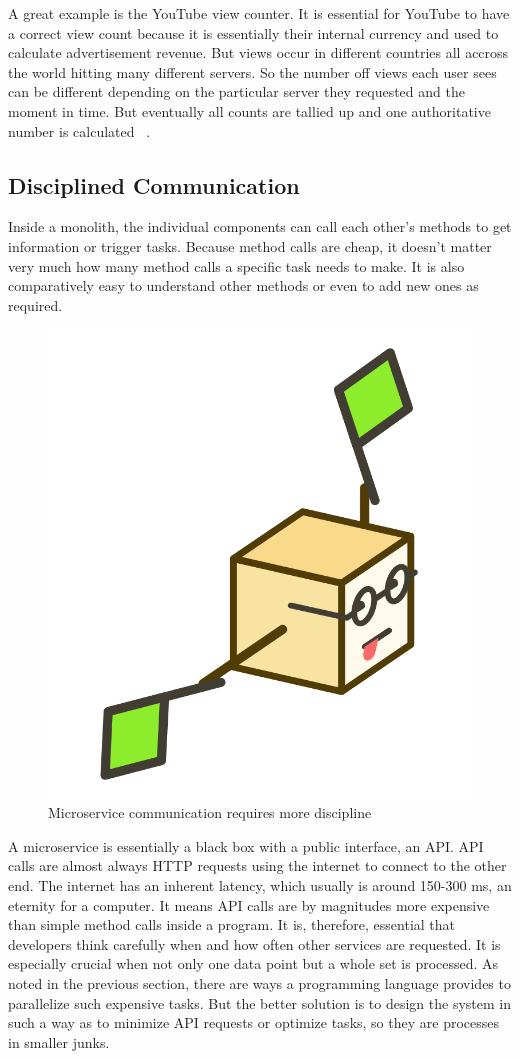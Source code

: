 A great example is the YouTube view counter. It is essential for YouTube to have a correct view count because it is essentially their internal currency and used to calculate advertisement revenue. But views occur in different countries all accross the world hitting many different servers. So the number off views each user sees can be different depending on the particular server they requested and the moment in time. But eventually all counts are tallied up and one authoritative number is calculated
~\cite{scott.2018}.


\subsection{Disciplined Communication}
\label{sec:theory:challenges:communication}

Inside a monolith, the individual components can call each other's methods to get information or trigger tasks. Because method calls are cheap, it doesn't matter very much how many method calls a specific task needs to make. It is also comparatively easy to understand other methods or even to add new ones as required.

\begin{figure}[ht]
  \centering
  \includegraphics[width=0.25\linewidth]{assets/illustration-microservice-flags.png}
  \caption{Microservice communication requires more discipline}
\end{figure}

A microservice is essentially a black box with a public interface, an API. API calls are almost always HTTP requests using the internet to connect to the other end. The internet has an inherent latency, which usually is around 150-300 ms, an eternity for a computer. It means API calls are by magnitudes more expensive than simple method calls inside a program. It is, therefore, essential that developers think carefully when and how often other services are requested. It is especially crucial when not only one data point but a whole set is processed. As noted in the previous section, there are ways a programming language provides to parallelize such expensive tasks. But the better solution is to design the system in such a way as to minimize API requests or optimize tasks, so they are processes in smaller junks.


